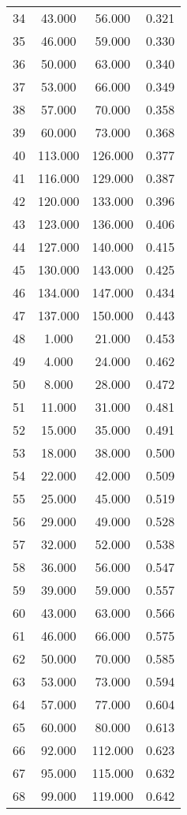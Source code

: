 \begin{tabular}{cccc}
  34 & 43.000 & 56.000 & 0.321 \\ 
  35 & 46.000 & 59.000 & 0.330 \\ 
  36 & 50.000 & 63.000 & 0.340 \\ 
  37 & 53.000 & 66.000 & 0.349 \\ 
  38 & 57.000 & 70.000 & 0.358 \\ 
  39 & 60.000 & 73.000 & 0.368 \\ 
  40 & 113.000 & 126.000 & 0.377 \\ 
  41 & 116.000 & 129.000 & 0.387 \\ 
  42 & 120.000 & 133.000 & 0.396 \\ 
  43 & 123.000 & 136.000 & 0.406 \\ 
  44 & 127.000 & 140.000 & 0.415 \\ 
  45 & 130.000 & 143.000 & 0.425 \\ 
  46 & 134.000 & 147.000 & 0.434 \\ 
  47 & 137.000 & 150.000 & 0.443 \\ 
  48 & 1.000 & 21.000 & 0.453 \\ 
  49 & 4.000 & 24.000 & 0.462 \\ 
  50 & 8.000 & 28.000 & 0.472 \\ 
  51 & 11.000 & 31.000 & 0.481 \\ 
  52 & 15.000 & 35.000 & 0.491 \\ 
  53 & 18.000 & 38.000 & 0.500 \\ 
  54 & 22.000 & 42.000 & 0.509 \\ 
  55 & 25.000 & 45.000 & 0.519 \\ 
  56 & 29.000 & 49.000 & 0.528 \\ 
  57 & 32.000 & 52.000 & 0.538 \\ 
  58 & 36.000 & 56.000 & 0.547 \\ 
  59 & 39.000 & 59.000 & 0.557 \\ 
  60 & 43.000 & 63.000 & 0.566 \\ 
  61 & 46.000 & 66.000 & 0.575 \\ 
  62 & 50.000 & 70.000 & 0.585 \\ 
  63 & 53.000 & 73.000 & 0.594 \\ 
  64 & 57.000 & 77.000 & 0.604 \\ 
  65 & 60.000 & 80.000 & 0.613 \\ 
  66 & 92.000 & 112.000 & 0.623 \\ 
  67 & 95.000 & 115.000 & 0.632 \\ 
  68 & 99.000 & 119.000 & 0.642 \\ 

\end{tabular}
